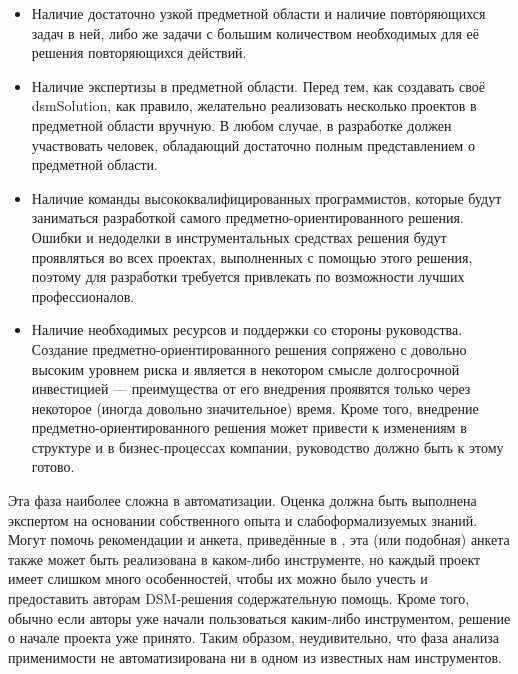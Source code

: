 \begin{itemize}
	\item Наличие достаточно узкой предметной области и наличие повторяющихся задач в ней, 
		либо же задачи с большим количеством необходимых для её решения повторяющихся действий.
	\item Наличие экспертизы в предметной области.  Перед тем, как создавать своё \ac{dsmSolution}, 
		как правило, желательно реализовать несколько проектов в предметной области вручную. 
		В любом случае, в разработке должен участвовать человек, обладающий достаточно полным 
		представлением о предметной области.
	\item Наличие команды высококвалифицированных программистов, которые будут заниматься разработкой 
		самого предметно-ориентированного решения. Ошибки и недоделки в инструментальных средствах 
		решения будут проявляться во всех проектах, выполненных с помощью этого решения, поэтому 
		для разработки требуется привлекать по возможности лучших профессионалов.
	\item Наличие необходимых ресурсов и поддержки со стороны руководства. Создание предметно-ориентированного 
		решения сопряжено с довольно высоким уровнем риска и является в некотором смысле долгосрочной 
		инвестицией --- преимущества от его внедрения проявятся только через некоторое (иногда 
		довольно значительное) время. Кроме того, внедрение предметно-ориентированного решения 
		может привести к изменениям в структуре и в бизнес-процессах компании, руководство 
		должно быть к этому готово.
\end{itemize}

Эта фаза наиболее сложна в автоматизации. Оценка должна быть выполнена экспертом на 
основании собственного опыта и слабоформализуемых знаний. Могут помочь рекомендации 
и анкета, приведённые в \cite{kelly2008domain}, эта (или подобная) анкета также может 
быть реализована в каком-либо инструменте, но каждый проект имеет слишком много особенностей, 
чтобы их можно было учесть и предоставить авторам \ac{DSM}-решения содержательную помощь. 
Кроме того, обычно если авторы уже начали пользоваться каким-либо инструментом, решение 
о начале проекта уже принято. Таким образом, неудивительно, что фаза анализа применимости 
не автоматизирована ни в одном из известных нам инструментов.

